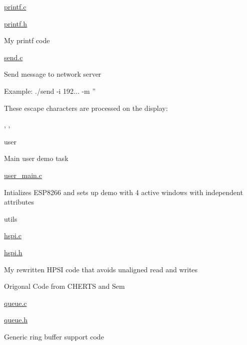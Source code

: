 \begin{DoxyItemize}
\begin{DoxyItemize}
\begin{DoxyItemize}
\begin{DoxyItemize}
\end{DoxyItemize}
\item \hyperlink{printf_8c}{printf.\-c}
\item \hyperlink{printf_8h}{printf.\-h}
\begin{DoxyItemize}
\item My printf code
\end{DoxyItemize}
\end{DoxyItemize}
\end{DoxyItemize}
\item \hyperlink{send_8c}{send.\-c}
\begin{DoxyItemize}
\item Send message to network server
\item Example\-: ./send -\/i 192... -\/m ''
\begin{DoxyItemize}
\item These escape characters are processed on the display\-: \par
, , 
\end{DoxyItemize}
\end{DoxyItemize}
\item user
\begin{DoxyItemize}
\item Main user demo task
\item \hyperlink{user__main_8c}{user\-\_\-main.\-c}
\begin{DoxyItemize}
\item Intializes E\-S\-P8266 and sets up demo with 4 active windows with independent attributes
\end{DoxyItemize}
\end{DoxyItemize}
\item utils
\begin{DoxyItemize}
\item \hyperlink{hspi_8c}{hspi.\-c}
\item \hyperlink{hspi_8h}{hspi.\-h}
\begin{DoxyItemize}
\item My rewritten H\-P\-S\-I code that avoids unaligned read and writes
\item Origonal Code from C\-H\-E\-R\-T\-S and Sem
\end{DoxyItemize}
\item \hyperlink{queue_8c}{queue.\-c}
\item \hyperlink{queue_8h}{queue.\-h}
\begin{DoxyItemize}
\item Generic ring buffer support code

\end{DoxyItemize}
\end{DoxyItemize}
\end{DoxyItemize}
